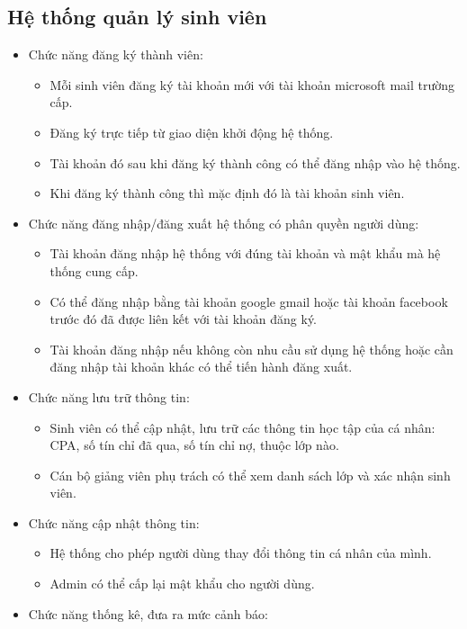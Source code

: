 \subsection{Hệ thống quản lý sinh viên}
\begin{itemize}
	\item Chức năng đăng ký thành viên:
	      \begin{itemize}
		      \item Mỗi sinh viên đăng ký tài khoản mới với tài khoản microsoft mail trường cấp.
		      \item Đăng ký trực tiếp từ giao diện khởi động hệ thống.
		      \item Tài khoản đó sau khi đăng ký thành công có thể đăng nhập vào hệ thống.
		      \item Khi đăng ký thành công thì mặc định đó là tài khoản sinh viên.
	      \end{itemize}
	\item Chức năng đăng nhập/đăng xuất hệ thống có phân quyền người dùng:
	      \begin{itemize}
		      \item Tài khoản đăng nhập hệ thống với đúng tài khoản và mật khẩu mà hệ thống cung cấp.
		      \item Có thể đăng nhập bằng tài khoản google gmail hoặc tài khoản facebook trước đó đã được liên kết với tài khoản đăng ký.
		      \item Tài khoản đăng nhập nếu không còn nhu cầu sử dụng hệ thống hoặc cần đăng nhập tài khoản khác có thể tiến hành đăng xuất.
	      \end{itemize}
	\item Chức năng lưu trữ thông tin:
	      \begin{itemize}
		      \item Sinh viên có thể cập nhật, lưu trữ các thông tin học tập của cá nhân: CPA, số tín chỉ đã qua, số tín chỉ nợ, thuộc lớp nào.
		      \item Cán bộ giảng viên phụ trách có thể xem danh sách lớp và xác nhận sinh viên.
	      \end{itemize}
	\item Chức năng cập nhật thông tin:
	      \begin{itemize}
		      \item Hệ thống cho phép người dùng thay đổi thông tin cá nhân của mình.
		      \item Admin có thể cấp lại mật khẩu cho người dùng.
	      \end{itemize}
	\item Chức năng thống kê, đưa ra mức cảnh báo:

\end{itemize}
